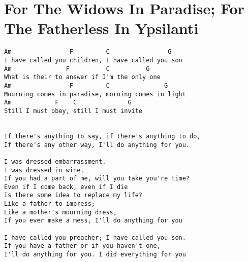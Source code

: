 \documentclass[leqno]{memoir}
\begin{document}
\chapter{For The Widows In Paradise; For The Fatherless In Ypsilanti}
\begin{verbatim}
Am                F         C                G 
I have called you children, I have called you son 
Am               F          C          G 
What is their to answer if I'm the only one 
Am                F         C               G 
Mourning comes in paradise, morning comes in light 
Am            F    C              G 
Still I must obey, still I must invite 


If there's anything to say, if there's anything to do,
If there's any other way, I'll do anything for you.

I was dressed embarrassment.
I was dressed in wine.
If you had a part of me, will you take you're time?
Even if I come back, even if I die
Is there some idea to replace my life?
Like a father to impress;
Like a mother's mourning dress,
If you ever make a mess, I'll do anything for you

I have called you preacher; I have called you son.
If you have a father or if you haven't one,
I'll do anything for you. I did everything for you
\end{verbatim}
\newpage
\end{document}
